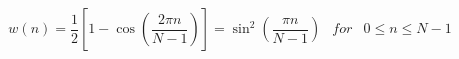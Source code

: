 \documentclass[../main.tex]{subfiles}%
\begin{document}
%
    \Xequation%
    \begin{equation}%
        \begin{array}{ccl}%
            w(n)%
            = \dfrac{1}{2} \left[ 1 - \cos\left( \dfrac{2 \pi n}{N - 1} \right) \right]%
            = \sin^{2}\left( \dfrac{\pi n}{N - 1} \right)%
            &%
            for%
            &%
            0 \leq n \leq N-1%
        \end{array}%
        \label{eq:hann-window}%
    \end{equation}%
\end{document}
